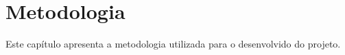 \chapter{Metodologia}

Este capítulo apresenta a metodologia utilizada para o desenvolvido do projeto.

